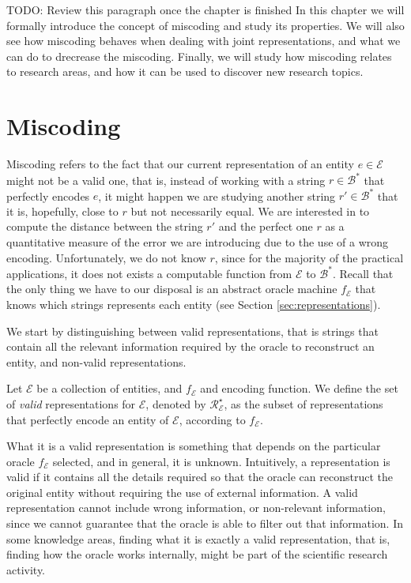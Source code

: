 {\color{red} TODO: Review this paragraph once the chapter is finished} In this chapter we will formally introduce the concept of miscoding and study its properties. We will also see how miscoding behaves when dealing with joint representations, and what we can do to drecrease the miscoding. Finally, we will study how miscoding relates to research areas, and how it can be used to discover new research topics.

%
%
\section{Miscoding}
\label{sec:miscoding}

Miscoding refers to the fact that our current representation of an entity $e \in \mathcal{E}$ might not be a valid one, that is, instead of working with a string $r \in \mathcal{B}^\ast$ that perfectly encodes $e$, it might happen we are studying another string $r' \in \mathcal{B}^\ast$ that it is, hopefully, close to $r$ but not necessarily equal. We are interested in to compute the distance between the string $r'$ and the perfect one $r$ as a quantitative measure of the error we are introducing due to the use of a wrong encoding. Unfortunately, we do not know $r$, since for the majority of the practical applications, it does not exists a computable function from $\mathcal{E}$ to $\mathcal{B}^\ast$. Recall that the only thing we have to our disposal is an abstract oracle machine $f_\mathcal{E}$ that knows which strings represents each entity (see Section \ref{sec:representations}).

We start by distinguishing between valid representations, that is strings that contain all the relevant information required by the oracle to reconstruct an entity, and non-valid representations.

\begin{definition}
Let $\mathcal{E}$ be a collection of entities, and $f_\mathcal{E}$ and encoding function. We define the set of \emph{valid} representations for $\mathcal{E}$, denoted by $\mathcal{R}^\star_\mathcal{E}$, as the subset of representations that perfectly encode an entity of $\mathcal{E}$, according to $f_\mathcal{E}$.
\end{definition}

What it is a valid representation is something that depends on the particular oracle $f_\mathcal{E}$ selected, and in general, it is unknown. Intuitively, a representation is valid if it contains all the details required so that the oracle can reconstruct the original entity without requiring the use of external information. A valid representation cannot include wrong information, or non-relevant information, since we cannot guarantee that the oracle is able to filter out that information. In some knowledge areas, finding what it is exactly a valid representation, that is, finding how the oracle works internally, might be part of the scientific research activity.

